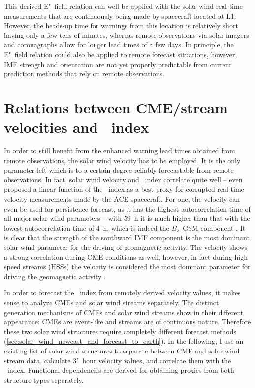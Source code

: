 This derived E"~field relation can well be applied with the solar wind real-time measurements that are continuously being made by spacecraft located at L1. However, the heads-up time for warnings from this location is relatively short having only a few tens of minutes, whereas remote observations via solar imagers and coronagraphs allow for longer lead times of a few days. In principle, the E"~field relation could also be applied to remote forecast situations, however, IMF strength and orientation are not yet properly predictable from current prediction methods that rely on remote observations.


\section{Relations between CME/stream velocities and \Kp~index}
\label{sec:relations_between_cme_stream_v_and_kp}
In order to still benefit from the enhanced warning lead times obtained from remote observations, the solar wind velocity has to be employed. It is the only parameter left which is to a certain degree reliably forecastable from remote observations. In fact, solar wind velocity and \Kp~index correlate quite well -- \citet{Machol2013} even proposed a linear function of the \Kp~index as a best proxy for corrupted real-time velocity measurements made by the ACE spacecraft. For one, the velocity can even be used for persistence forecast, as it has the highest autocorrelation time of all major solar wind parameters -- with \SI{59}{\hour} it is much higher than that with the lowest autocorrelation time of \SI{4}{\hour}, which is indeed the $B_\text{z}$~GSM component \citep{Elliott2013}.
It is clear that the strength of the southward IMF component is the most dominant solar wind parameter for the driving of geomagnetic activity. The velocity shows a strong correlation during CME conditions as well, however, in fact during high speed streams (HSSs) the velocity is considered the most dominant parameter for driving the geomagnetic activity \citep{Holappa2014}.

In order to forecast the \Kp~index from remotely derived velocity values, it makes sense to analyze CMEs and solar wind streams separately. The distinct generation mechanisms of CMEs and solar wind streams show in their different appearance: CMEs are event-like and streams are of continuous nature. Therefore these two solar wind structures require completely different forecast methods (\autoref{sec:solar_wind_nowcast_and_forecast_to_earth}).
In the following, I use an existing list of solar wind structures to separate between CME and solar wind stream data, calculate 3"~hour velocity values, and correlate them with the \Kp~index. Functional dependencies are derived for obtaining \Kp{} proxies from both structure types separately.

